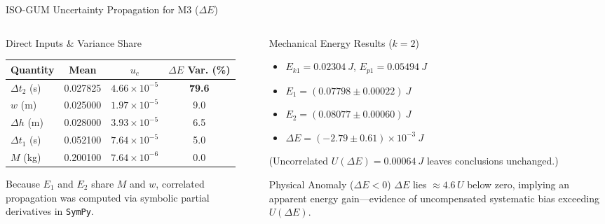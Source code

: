 \documentclass[aspectratio=169,10pt]{beamer}
\newcommand{\sm}{\fontsize{8.2}{10.2}\selectfont}
\newcommand{\xs}{\fontsize{7.1}{9}\selectfont}
\newcommand{\uc}{u_{c}}
\begin{document}
\begin{frame}{ISO-GUM Uncertainty Propagation for M3 ($\Delta E$)}
\begin{columns}[T,onlytextwidth]
\begin{column}{.50\textwidth}
\begin{block}{Direct Inputs \& Variance Share}\xs
\centering
\setlength{\tabcolsep}{3.5pt}\begin{tabular}{@{}lccc@{}}
\toprule
\textbf{Quantity} & \textbf{Mean} & $\uc$ & \textbf{$\Delta E$ Var. (\%)}\\
\midrule
$\Delta t_2$ (s) & 0.027825 & $4.66\times 10^{-5}$ & \textbf{79.6}\\
$w$ (m) & 0.025000 & $1.97\times 10^{-5}$ & 9.0\\
$\Delta h$ (m) & 0.028000 & $3.93\times 10^{-5}$ & 6.5\\
$\Delta t_1$ (s) & 0.052100 & $7.64\times 10^{-5}$ & 5.0\\
$M$ (kg) & 0.200100 & $7.64\times 10^{-6}$ & 0.0\\
\bottomrule
\end{tabular}
\par\vspace{1.5mm}\raggedright
Because $E_1$ and $E_2$ share $M$ and $w$, correlated propagation was computed via symbolic partial derivatives in \texttt{SymPy}.
\end{block}
\end{column}

\begin{column}{.48\textwidth}
\begin{exampleblock}{Mechanical Energy Results ($k=2$)}\sm
\begin{itemize}
\item $E_{k1} = \SI{0.02304}{J}$, \quad $E_{p1} = \SI{0.05494}{J}$
\item $E_1 = (0.07798 \pm 0.00022)\ \si{J}$
\item $E_2 = (0.08077 \pm 0.00060)\ \si{J}$
\item $\boxed{\Delta E = (-2.79 \pm 0.61)\times 10^{-3}\ \si{J}}$
\end{itemize}
{\xs (Uncorrelated $U(\Delta E)=\SI{0.00064}{J}$ leaves conclusions unchanged.)}
\end{exampleblock}
\begin{alertblock}{Physical Anomaly ($\Delta E < 0$)}\xs
$\Delta E$ lies $\approx 4.6\,U$ below zero, implying an apparent energy gain—evidence of uncompensated systematic bias exceeding $U(\Delta E)$.
\end{alertblock}
\end{column}
\end{columns}
\end{frame}
\end{document}
